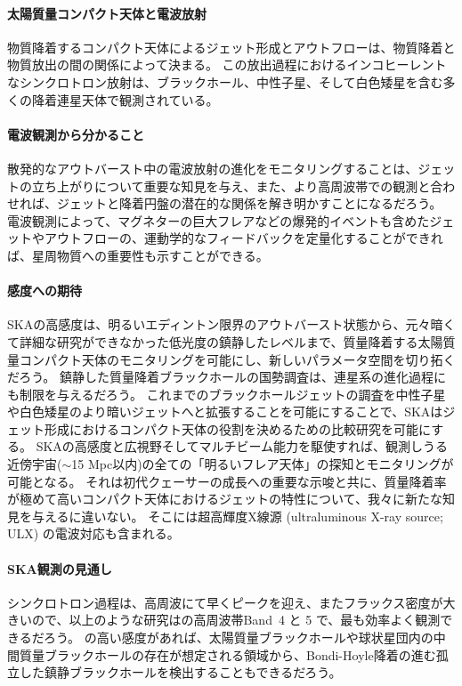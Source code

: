 \paragraph{太陽質量コンパクト天体と電波放射}

物質降着するコンパクト天体によるジェット形成とアウトフローは、物質降着と物質放出の間の関係によって決まる。
この放出過程におけるインコヒーレントなシンクロトロン放射は、ブラックホール、中性子星、そして白色矮星を含む多くの降着連星天体で観測されている。

\paragraph{電波観測から分かること}

散発的なアウトバースト中の電波放射の進化をモニタリングすることは、ジェットの立ち上がりについて重要な知見を与え、また、より高周波帯での観測と合わせれば、ジェットと降着円盤の潜在的な関係を解き明かすことになるだろう。
電波観測によって、マグネターの巨大フレアなどの爆発的イベントも含めたジェットやアウトフローの、運動学的なフィードバックを定量化することができれば、星周物質への重要性も示すことができる。

\paragraph{感度への期待}

SKAの高感度は、明るいエディントン限界のアウトバースト状態から、元々暗くて詳細な研究ができなかった低光度の鎮静したレベルまで、質量降着する太陽質量コンパクト天体のモニタリングを可能にし、新しいパラメータ空間を切り拓くだろう。
鎮静した質量降着ブラックホールの国勢調査は、連星系の進化過程にも制限を与えるだろう。
これまでのブラックホールジェットの調査を中性子星や白色矮星のより暗いジェットへと拡張することを可能にすることで、SKAはジェット形成におけるコンパクト天体の役割を決めるための比較研究を可能にする。
SKAの高感度と広視野そしてマルチビーム能力を駆使すれば、観測しうる近傍宇宙($\sim$15 Mpc以内)の全ての「明るいフレア天体」の探知とモニタリングが可能となる。
それは初代クェーサーの成長への重要な示唆と共に、質量降着率が極めて高いコンパクト天体におけるジェットの特性について、我々に新たな知見を与えるに違いない。
そこには超高輝度X線源 (ultraluminous X-ray source; ULX) の電波対応も含まれる。

\paragraph{SKA観測の見通し}

シンクロトロン過程は、高周波にて早くピークを迎え、またフラックス密度が大きいので、以上のような研究はの高周波帯Band~4 と 5 で、最も効率よく観測できるだろう。
 の高い感度があれば、太陽質量ブラックホールや球状星団内の中間質量ブラックホールの存在が想定される領域から、Bondi-Hoyle降着の進む孤立した鎮静ブラックホールを検出することもできるだろう。

